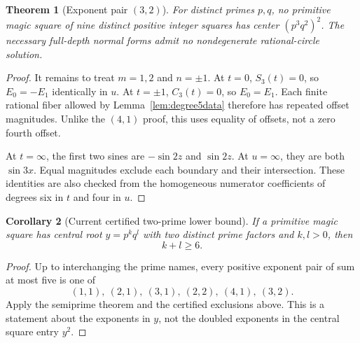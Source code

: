 \documentclass[11pt]{article}
\newtheorem{theorem}{Theorem}[section]
\newtheorem{corollary}[theorem]{Corollary}
\theoremstyle{definition}\newtheorem{definition}[theorem]{Definition}
\theoremstyle{remark}\newtheorem{remark}[theorem]{Remark}
\begin{document}
\begin{theorem}[Exponent pair $(3,2)$]\label{thm:32}
For distinct primes $p,q$, no primitive magic square of nine distinct positive integer squares has center $(p^3q^2)^2$. The necessary full-depth normal forms admit no nondegenerate rational-circle solution.
\end{theorem}
\begin{proof}
It remains to treat $m=1,2$ and $n=\pm1$. At $t=0$, $S_3(t)=0$, so $E_0=-E_1$ identically in $u$. At $t=\pm1$, $C_3(t)=0$, so $E_0=E_1$. Each finite rational fiber allowed by Lemma~\ref{lem:degree5data} therefore has repeated offset magnitudes. Unlike the $(4,1)$ proof, this uses equality of offsets, not a zero fourth offset.

At $t=\infty$, the first two sines are $-\sin2z$ and $\sin2z$. At $u=\infty$, they are both $\sin3x$. Equal magnitudes exclude each boundary and their intersection. These identities are also checked from the homogeneous numerator coefficients of degrees six in $t$ and four in $u$.
\end{proof}

\begin{corollary}[Current certified two-prime lower bound]\label{cor:bound}
If a primitive magic square has central root $y=p^kq^l$ with two distinct prime factors and $k,l>0$, then
\[
\boxed{k+l\ge6.}
\]
\end{corollary}
\begin{proof}
Up to interchanging the prime names, every positive exponent pair of sum at most five is one of
\[
(1,1),\ (2,1),\ (3,1),\ (2,2),\ (4,1),\ (3,2).
\]
Apply the semiprime theorem and the certified exclusions above. This is a statement about the exponents in $y$, not the doubled exponents in the central square entry $y^2$.
\end{proof}
\end{document}
